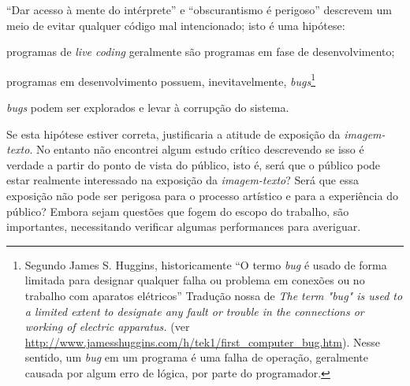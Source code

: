 ``Dar acesso à mente do intérprete'' e ``obscurantismo é perigoso'' descrevem um meio de evitar qualquer código mal intencionado; isto é uma hipótese: \begin{inparaenum}
\item programas de \emph{live coding} geralmente são programas em fase de desenvolvimento;
\item programas em desenvolvimento possuem, inevitavelmente, \emph{bugs}\footnote{Segundo James S. Huggins, historicamente ``O termo \emph{bug} é usado de forma limitada para designar qualquer falha ou problema em conexões ou no trabalho com aparatos elétricos'' Tradução nossa de \emph{The term "bug" is used to a limited extent to designate any fault or trouble in the connections or working of electric apparatus.} (ver \url{http://www.jamesshuggins.com/h/tek1/first_computer_bug.htm}). Nesse sentido, um \emph{bug} em um programa é uma falha de operação, geralmente causada por algum erro de lógica, por parte do programador.}
\item \emph{bugs} podem ser explorados e levar à corrupção do sistema.
\end{inparaenum} Se esta hipótese estiver correta, justificaria a atitude de exposição da \emph{imagem-texto}. No entanto não encontrei algum estudo crítico descrevendo se isso é verdade a partir do ponto de vista do público, isto é, será que o público pode estar realmente interessado na exposição da \emph{imagem-texto}? Será que essa exposição não pode ser perigosa para o processo artístico e para a experiência do público? Embora sejam questões que fogem do escopo do trabalho, são importantes, necessitando verificar algumas performances para averiguar.

